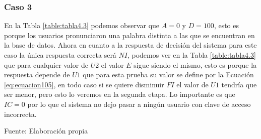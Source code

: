 \subsubsection{Caso 3}
En la Tabla \ref{table:tabla4.3} podemos observar que $A = 0$ y $D = 100$, esto es porque los usuarios pronunciaron una palabra distinta a las que se encuentran en la base de datos.
\vskip 0.5cm
Ahora en cuanto a la respuesta de decisión del sistema para este caso la única respuesta correcta será $NI$, podemos ver en la Tabla \ref{table:tabla4.3} que para cualquier valor de $U2$ el valor $E$ sigue siendo el mismo, esto es porque la respuesta depende de $U1$ que para esta prueba su valor se define por la Ecuación \eqref{eq:ecuacion105}, en todo caso si se quiere disminuir $FI$ el valor de $U1$ tendría que ser menor, pero esto lo veremos en la segunda etapa. Lo importante es que $IC = 0$ por lo que el sistema no dejo pasar a ningún usuario con clave de acceso incorrecta.

\begin{center}
\begin{table}[H]
\centering
\caption{\small{Resultados para obtener U2 en el caso 3.}}
\label{table:tabla4.3}
\vskip 0.2cm
\begin{center}
\vskip 0.2cm
{\small{Fuente: Elaboración propia}}
\end{center}
\end{table}
\end{center}

